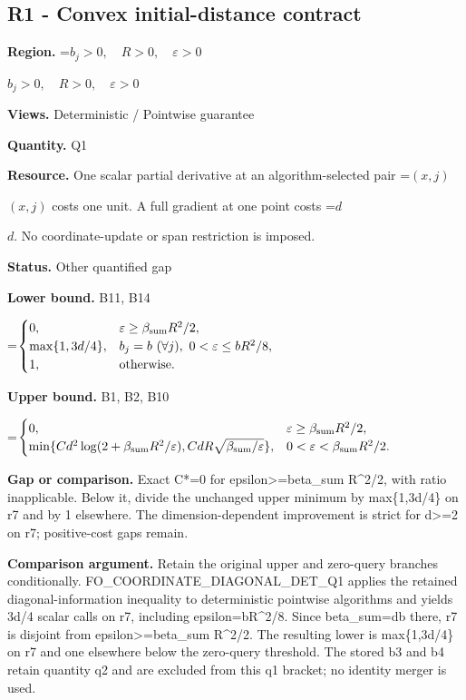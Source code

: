 \documentclass[10pt,a4paper]{article}
\newcommand{\AtlasMath}[1]{\par\begingroup\centering\setbox0=\hbox{$\displaystyle #1$}\ifdim\wd0>1.4\linewidth\typeout{ATLAS WIDE FORMULA: \the\wd0}\fi\ifdim\wd0>\linewidth\resizebox{\linewidth}{!}{\box0}\else\box0\fi\par\endgroup}
\newcommand{\AtlasInlineMath}[1]{\begingroup\setbox0=\hbox{$#1$}\ifdim\wd0>.4\linewidth\endgroup\AtlasMath{#1}\else\endgroup$#1$\fi}
\begin{document}
\subsection{R1 - Convex initial-distance contract}
\textbf{Region.} \AtlasInlineMath{b_j>0,\quad R>0,\quad\varepsilon>0}

\textbf{Views.} Deterministic / Pointwise guarantee

\textbf{Quantity.} Q1

\textbf{Resource.} One scalar partial derivative at an algorithm-selected pair \AtlasInlineMath{(x,j)} costs one unit. A full gradient at one point costs \AtlasInlineMath{d}. No coordinate-update or span restriction is imposed.

\textbf{Status.} Other quantified gap

\textbf{Lower bound.} B11, B14

\AtlasMath{\begin{cases}0,&\varepsilon\ge\beta_{\rm sum}R^2/2,\\\max\{1,3d/4\},&b_j=b\ (\forall j),\ 0<\varepsilon\le bR^2/8,\\1,&\text{otherwise}.\end{cases}}
\textbf{Upper bound.} B1, B2, B10

\AtlasMath{\begin{cases}0,&\varepsilon\ge\beta_{\rm sum}R^2/2,\\\min\{Cd^2\log(2+\beta_{\rm sum}R^2/\varepsilon),CdR\sqrt{\beta_{\rm sum}/\varepsilon}\},&0<\varepsilon<\beta_{\rm sum}R^2/2.\end{cases}}
\textbf{Gap or comparison.} Exact C*=0 for epsilon>=beta\_\allowbreak{}sum R\textasciicircum{}2/2, with ratio inapplicable. Below it, divide the unchanged upper minimum by max\{1,3d/4\} on r7 and by 1 elsewhere. The dimension-dependent improvement is strict for d>=2 on r7; positive-cost gaps remain.

\textbf{Comparison argument.} Retain the original upper and zero-query branches conditionally. FO\_\allowbreak{}COORDINATE\_\allowbreak{}DIAGONAL\_\allowbreak{}DET\_\allowbreak{}Q1 applies the retained diagonal-information inequality to deterministic pointwise algorithms and yields 3d/4 scalar calls on r7, including epsilon=bR\textasciicircum{}2/8. Since beta\_\allowbreak{}sum=db there, r7 is disjoint from epsilon>=beta\_\allowbreak{}sum R\textasciicircum{}2/2. The resulting lower is max\{1,3d/4\} on r7 and one elsewhere below the zero-query threshold. The stored b3 and b4 retain quantity q2 and are excluded from this q1 bracket; no identity merger is used.
\end{document}
